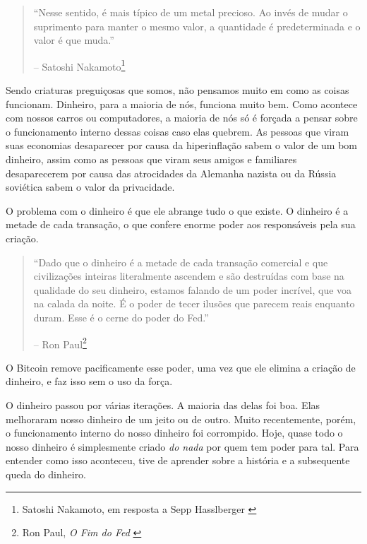 \begin{quotation}\begin{samepage}
\enquote{Nesse sentido, é mais típico de um metal precioso. Ao invés de
mudar o suprimento para manter o mesmo valor, a quantidade é
predeterminada e o valor é que muda.}
\begin{flushright} -- Satoshi Nakamoto\footnote{Satoshi Nakamoto, em resposta a Sepp Hasslberger \cite{satoshi-precious-metal}}
\end{flushright}\end{samepage}\end{quotation}

Sendo criaturas preguiçosas que somos, não pensamos muito em como as coisas funcionam. Dinheiro, para a maioria de nós, funciona muito bem. Como acontece com nossos carros ou computadores, a maioria de nós só é forçada a pensar sobre o funcionamento interno dessas coisas caso elas quebrem. As pessoas que viram suas economias desaparecer por causa da hiperinflação sabem o valor de um bom dinheiro, assim como as pessoas que viram seus amigos e familiares desaparecerem por causa das atrocidades da Alemanha nazista ou da Rússia soviética sabem o valor da privacidade.

O problema com o dinheiro é que ele abrange tudo o que existe. O dinheiro é a metade de cada transação, o que confere enorme poder aos responsáveis pela sua criação.

\begin{quotation}\begin{samepage}
\enquote{Dado que o dinheiro é a metade de cada transação comercial e que civilizações inteiras literalmente ascendem e são destruídas com base na qualidade do seu dinheiro, estamos falando de um poder incrível, que voa na calada da noite. É o poder de tecer ilusões que parecem reais enquanto duram. Esse é o cerne do poder do Fed.}
\begin{flushright} -- Ron Paul\footnote{Ron Paul, \textit{O Fim do Fed} \cite{end-the-fed}}
\end{flushright}\end{samepage}\end{quotation}

O Bitcoin remove pacificamente esse poder, uma vez que ele elimina a criação de dinheiro, e faz isso sem o uso da força.

O dinheiro passou por várias iterações. A maioria das delas foi boa. Elas melhoraram nosso dinheiro de um jeito ou de outro. Muito recentemente, porém, o funcionamento interno do nosso dinheiro foi corrompido. Hoje, quase todo o nosso dinheiro é simplesmente criado \textit{do nada} por quem tem poder para tal. Para entender como isso aconteceu, tive de aprender sobre a história e a subsequente queda do dinheiro.

